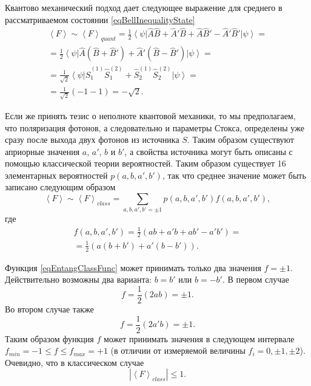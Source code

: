Квантово механический подход дает следующее выражение для среднего в
рассматриваемом состоянии \eqref{eqBellInequalityState} 
\begin{eqnarray}
 \left<F\right> \sim \left<F\right>_{quant} 
=\frac{1}{2}
\left<\psi\right|
\hat{A}\hat{B} + \hat{A}'\hat{B} + \hat{A}\hat{B}' - \hat{A}'\hat{B}'
\left|\psi\right> = 
\nonumber \\
=\frac{1}{2}
\left<\psi\right|
\hat{A}\left(\hat{B} + \hat{B}'\right) + \hat{A}' \left(\hat{B}  -
\hat{B}' \right)
\left|\psi\right> = 
\nonumber \\
= \frac{1}{\sqrt{2}}
\left<\psi\right|
\hat{S}_1^{(1)}\hat{S}_1^{(2)} + \hat{S}_2^{(1)}\hat{S}_2^{(2)}
\left|\psi\right> =
\nonumber \\
= \frac{1}{\sqrt{2}}
\left(-1 - 1\right) = - \sqrt{2}.
\label{eqEntangQuant}
\end{eqnarray}

Если же принять тезис о неполноте квантовой механики, то мы
предполагаем, что поляризация фотонов, а следовательно и параметры
Стокса, определены уже сразу после выхода двух фотонов из источника
$S$.  
Таким образом существуют априорные значения $a$, $a'$, $b$ и $b'$,
а свойства источника могут быть описаны с помощью
классической теории вероятностей.
Таким образом существует 16 элементарных
вероятностей $p\left(a,b,a',b'\right)$, так что среднее значение может
быть записано следующим образом
\begin{equation}
 \left<F\right> \sim \left<F\right>_{class} 
=\sum_{a,b,a',b'=\pm 1} 
p\left(a,b,a',b'\right) f\left(a,b,a',b'\right),
\label{eqEntangClassFuncPre}
\end{equation}
где 
\begin{eqnarray}
 f\left(a,b,a',b'\right) = \frac{1}{2} 
\left(
ab + a'b + ab' - a'b'
\right) = 
\nonumber \\
=
\frac{1}{2} 
\left(
a \left(b + b'\right) + a' \left(b - b'\right)
\right).
\label{eqEntangClassFunc}
\end{eqnarray}

Функция \eqref{eqEntangClassFunc} может принимать только два значения
$f = \pm 1$. Действительно возможны два варианта: $b = b'$ или $b = - b'$. В
первом случае 
\[
f = \frac{1}{2}\left(2ab\right) = \pm 1.
\]
Во втором случае также 
\[
f = \frac{1}{2}\left(2a'b\right) = \pm 1.
\]
Таким образом функция $f$ может принимать значения в следующем
интервале $f_{min} = -1 \le f \le f_{max} = +1$ (в отличии от измеряемой величины
$f_i = 0, \pm 1, \pm 2$). Очевидно, что в классическом случае
\begin{equation}
\left|\left<F\right>_{class} \right| 
\le 1.
\label{eqEntangClass}
\end{equation}

